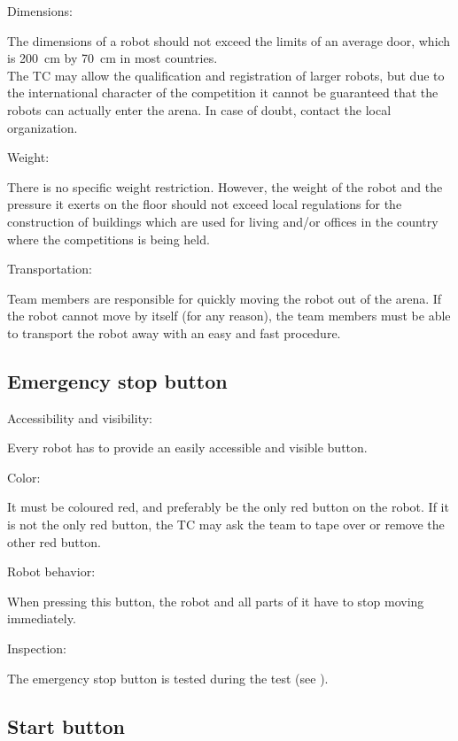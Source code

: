 \begin{enumerate}
	{\bf\item Dimensions:} The dimensions of a robot should not exceed the limits of an average door, which is \SI{200}{\centi\meter} by \SI{70}{\centi\meter} in most countries.\\ 
	The TC may allow the qualification and registration of larger robots, but due to the international character of the competition it cannot be guaranteed that the robots can actually enter the arena. In case of doubt, contact the local organization. 
	{\bf\item Weight:} There is no specific weight restriction. However, the weight of the robot and the pressure it exerts on the floor should not exceed local regulations for the construction of buildings which are used for living and/or offices in the country where the competitions is being held.
	{\bf\item Transportation:} Team members are responsible for quickly moving the robot out of the arena.	If the robot cannot move by itself (for any reason), the team members must be able to transport the robot away with an easy and fast procedure.
\end{enumerate}



\subsection{Emergency stop button}
\label{rule:robots_emergency_button}

\begin{enumerate}
	{\bf\item Accessibility and visibility:} Every robot has to provide an easily accessible and visible  button. 
	{\bf\item Color:} It must be coloured red, and preferably be the only red button on the robot. If it is not the only red button, the TC may ask the team to tape over or remove the other red button. 
	{\bf\item Robot behavior:} When pressing this button, the robot and all parts of it have to stop moving immediately.
	{\bf\item Inspection:} The emergency stop button is tested during the  test (see ).
\end{enumerate}



\subsection{Start button}
\label{rule:start_button}

